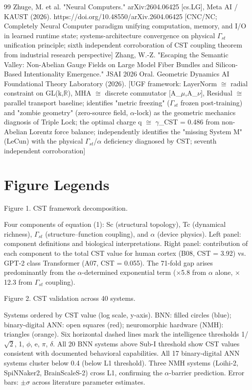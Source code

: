\documentclass[a4paper,12pt]{article}
\begin{document}
\begin{thebibliography}{99}
 Zhuge, M. et al. "Neural Computers." arXiv:2604.06425 [cs.LG], Meta AI / KAUST (2026). https://doi.org/10.48550/arXiv.2604.06425 [CNC/NC; Completely Neural Computer paradigm unifying computation, memory, and I/O in learned runtime state; systems-architecture convergence on physical $\Gamma_{st}$ unification principle; sixth independent corroboration of CST coupling theorem from industrial research perspective]
 Zhang, W.-Z. "Escaping the Semantic Valley: Non-Abelian Gauge Fields on Large Model Fiber Bundles and Silicon-Based Intentionality Emergence." JSAI 2026 Oral.
Geometric Dynamics AI Foundational Theory Laboratory (2026). [UGF framework: LayerNorm $\cong$ radial constraint on GL(k,$\mathbb{R}$), MHA $\cong$ discrete commutator [A_$\mu$,A_$\nu$], Residual $\cong$ parallel transport baseline; identifies "metric freezing" ($\Gamma_{st}$ frozen post-training) and "zombie geometry" (zero-source field, $\alpha$-lock) as the geometric mechanics diagnosis of Triple Lock; the optimal charge q
$\cong$ $\gamma$_CST = 0.486 from non-Abelian Lorentz force balance; independently identifies the "missing System M" (LeCun) with the physical $\Gamma_{st}$/$\alpha$ deficiency diagnosed by CST; seventh independent corroboration]
\end{thebibliography}

\section*{Figure Legends}
Figure 1. CST framework decomposition.

Four components of equation (1): Sc (structural topology), Tc (dynamical richness), $\Gamma_{st}$ (structure--function coupling), and $\alpha$ (device physics).
Left panel: component definitions and biological interpretations.
Right panel: contribution of each component to the total CST value for human cortex (B08, CST = 3.92) vs.
GPT-2 class Transformer (A07, CST = 0.055).
The 71-fold gap arises predominantly from the $\alpha$-determined exponential term ($\times$5.8 from $\alpha$ alone, $\times$12.3 from $\Gamma_{st}$ coupling).

Figure 2. CST validation across 40 systems.

Systems ordered by CST value (log scale, y-axis).
BNN: filled circles (blue); binary-digital ANN: open squares (red); neuromorphic hardware (NMH): triangles (orange).
Six horizontal dashed lines mark the intelligence thresholds {1/$\sqrt{2}$, 1, $\phi$, e, $\pi$, $\delta$}.
All 20 BNN systems above Sub-I threshold show CST values consistent with documented behavioral capabilities.
All 17 binary-digital ANN systems cluster below 0.4 (below L1 threshold).
Three NMH systems (Loihi-2, SpiNNaker2, BrainScaleS-2) cross L1, confirming the $\alpha$-barrier prediction.
Error bars: $\pm$$\sigma$ across literature parameter estimates.
\end{document}
